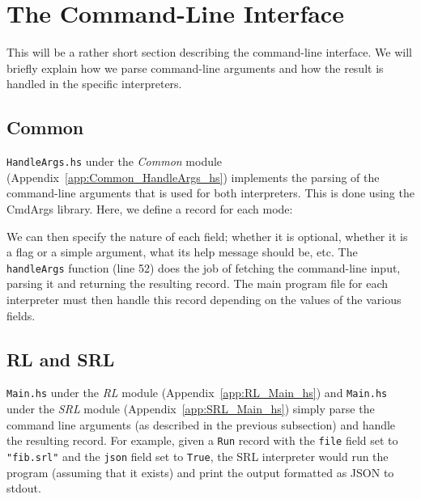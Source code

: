 \section{The Command-Line Interface}
\label{sec:implementation_cli}

This will be a rather short section describing the command-line interface. We will briefly explain how we parse command-line arguments and how the result is handled in the specific interpreters.

\subsection{Common}

\texttt{HandleArgs.hs} under the \textit{Common} module (Appendix~\ref{app:Common_HandleArgs_hs}) implements the parsing of the command-line arguments that is used for both interpreters. This is done using the CmdArgs library. Here, we define a record for each mode:

We can then specify the nature of each field; whether it is optional, whether it is a flag or a simple argument, what its help message should be, etc. The \texttt{handleArgs} function (line 52) does the job of fetching the command-line input, parsing it and returning the resulting record. The main program file for each interpreter must then handle this record depending on the values of the various fields.

\subsection{RL and SRL}
\texttt{Main.hs} under the \textit{RL} module (Appendix~\ref{app:RL_Main_hs}) and \texttt{Main.hs} under the \textit{SRL} module (Appendix~\ref{app:SRL_Main_hs}) simply parse the command line arguments (as described in the previous subsection) and handle the resulting record. For example, given a \texttt{Run} record with the \texttt{file} field set to \texttt{"fib.srl"} and the \texttt{json} field set to \texttt{True}, the SRL interpreter would run the program (assuming that it exists) and print the output formatted as JSON to stdout.

